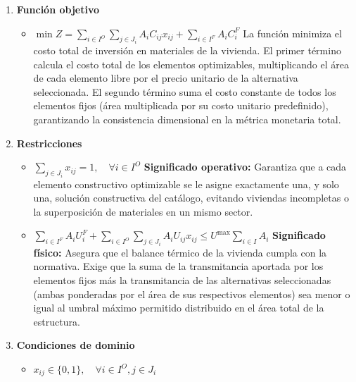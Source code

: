 \begin{enumerate}
    \vspace{1em}
    \item \textbf{Función objetivo}
    \begin{itemize}
        \item $\min Z = \sum_{i \in I^{O}} \sum_{j \in J_{i}} A_{i}C_{ij}x_{ij} + \sum_{i \in I^{F}} A_{i}C_{i}^{F}$
        \newline
        \newline La función minimiza el costo total de inversión en materiales de la vivienda. El primer término calcula el costo total de los elementos optimizables, multiplicando el área de cada elemento libre por el precio unitario de la alternativa seleccionada. El segundo término suma el costo constante de todos los elementos fijos (área multiplicada por su costo unitario predefinido), garantizando la consistencia dimensional en la métrica monetaria total.
    \end{itemize}

    \vspace{1em}
    \item \textbf{Restricciones}
    \begin{itemize}
        \item $\sum_{j \in J_{i}} x_{ij} = 1, \quad \forall i \in I^{O}$
        \newline \textbf{Significado operativo:} Garantiza que a cada elemento constructivo optimizable se le asigne exactamente una, y solo una, solución constructiva del catálogo, evitando viviendas incompletas o la superposición de materiales en un mismo sector.
        
        \item $\sum_{i \in I^{F}} A_{i}U_{i}^{F} + \sum_{i \in I^{O}} \sum_{j \in J_{i}} A_{i}U_{ij}x_{ij} \leq U^{\text{max}} \sum_{i \in I} A_{i}$
        \newline \textbf{Significado físico:} Asegura que el balance térmico de la vivienda cumpla con la normativa. Exige que la suma de la transmitancia aportada por los elementos fijos más la transmitancia de las alternativas seleccionadas (ambas ponderadas por el área de sus respectivos elementos) sea menor o igual al umbral máximo permitido distribuido en el área total de la estructura.
    \end{itemize}

    \vspace{1em}
    \item \textbf{Condiciones de dominio}
    \begin{itemize}
        \item $x_{ij} \in \{0, 1\}, \quad \forall i \in I^{O}, j \in J_{i}$
    \end{itemize}
\end{enumerate}
